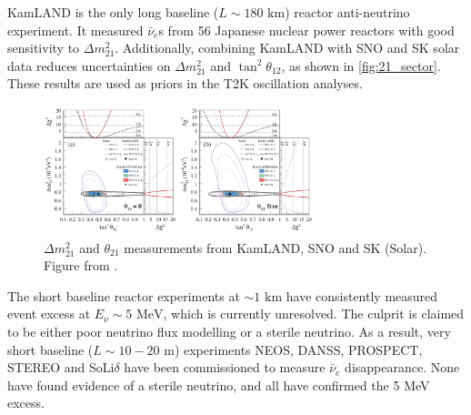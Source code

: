 KamLAND is the only long baseline ($L\sim180\text{ km}$) reactor anti-neutrino experiment. It measured $\bar{\nu}_e$s from 56 Japanese nuclear power reactors with good sensitivity to $\Delta m^2_{21}$. Additionally, combining KamLAND with SNO and SK solar data reduces uncertainties on $\Delta m^2_{21}$ and $\tan^2\theta_{12}$, as shown in \autoref{fig:21_sector}. These results are used as priors in the T2K oscillation analyses.
\begin{figure}[h]
	\includegraphics[width=0.7\textwidth, trim={0mm 0mm 0mm 0mm}, clip,page=1]{figures/theory/kamland_solar_comb}
	\caption{$\Delta m^2_{21}$ and $\theta_{21}$ measurements from KamLAND, SNO and SK (Solar). Figure from \cite{kamland_2011}.}
	\label{fig:21_sector}
\end{figure}

The short baseline reactor experiments at $\sim1\text{ km}$ have consistently measured event excess at $E_\nu\sim5\text{ MeV}$\cite{double_chooz, daya_bay, reno}, which is currently unresolved. The culprit is claimed to be either poor neutrino flux modelling or a sterile neutrino\cite{huber_neos,steriles}. As a result, very short baseline ($L\sim10-20\text{ m}$) experiments NEOS\cite{neos}, DANSS\cite{danss}, PROSPECT\cite{prospect}, STEREO\cite{stereo} and SoLi$\delta$\cite{solid} have been commissioned to measure $\bar{\nu}_e$ disappearance. None have found evidence of a sterile neutrino, and all have confirmed the 5 MeV excess.